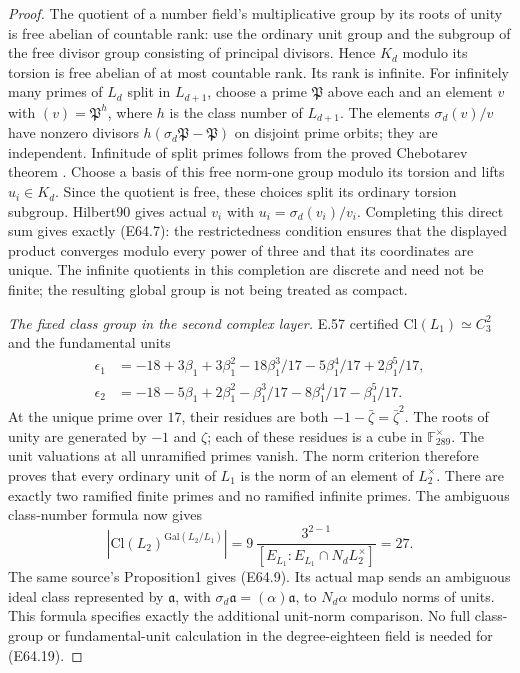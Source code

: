 \begin{proof}
The quotient of a number field's multiplicative group by its roots
of unity is free abelian of countable rank: use the ordinary unit
group and the subgroup of the free divisor group consisting of
principal divisors. Hence $K_d$ modulo its torsion is free abelian
of at most countable rank. Its rank is infinite.
For infinitely many primes of $L_d$ split in $L_{d+1}$, choose a
prime $\mathfrak P$ above each and an element $v$ with
$(v)=\mathfrak P^h$, where $h$ is the class number of $L_{d+1}$.
The elements $\sigma_d(v)/v$ have nonzero divisors
$h(\sigma_d\mathfrak P-\mathfrak P)$ on disjoint prime orbits;
they are independent. Infinitude of split primes follows from
the proved Chebotarev theorem
\cite[VIII, Theorem7.4]{E_MilneCFT}.
Choose a basis of this free norm-one group modulo its torsion
and lifts $u_i\in K_d$. Since the quotient is free, these choices
split its ordinary torsion subgroup. Hilbert90 gives actual
$v_i$ with $u_i=\sigma_d(v_i)/v_i$.
Completing this direct sum gives exactly (E64.7):
the restrictedness condition ensures that the displayed product
converges modulo every power of three and that its coordinates
are unique. The infinite quotients in this completion are
discrete and need not be finite; the resulting global group
is not being treated as compact.

\emph{The fixed class group in the second complex layer.}
E.57 certified
$\mathrm {Cl}(L_1)\simeq C_3^2$ and the fundamental units
\[
 \begin{split}
 \epsilon_1&=-18+3\beta_1+3\beta_1^2
       -18\beta_1^3/17-5\beta_1^4/17+2\beta_1^5/17,\\
 \epsilon_2&=-18-5\beta_1+2\beta_1^2
       -\beta_1^3/17-8\beta_1^4/17-\beta_1^5/17 .
 \end{split}
 \tag{E64.18}
\]
At the unique prime over $17$, their residues are both
$-1-\bar\zeta=\bar\zeta^2$.
The roots of unity are generated by $-1$ and $\zeta$; each
of these residues is a cube in $\mathbb F_{289}^\times$.
The unit valuations at all unramified primes vanish.
The norm criterion therefore proves that every ordinary unit of
$L_1$ is the norm of an element of $L_2^\times$.
There are exactly two ramified finite primes and no ramified
infinite primes. The ambiguous class-number formula
\cite[Theorem1, formula(1)]{E_LemmermeyerAmbiguous} now gives
\[
 |\mathrm {Cl}(L_2)^{\mathrm {Gal}(L_2/L_1)}|
     =9\,\frac{3^{2-1}}{[E_{L_1}:E_{L_1}\cap N_dL_2^\times]}
     =27 .
 \tag{E64.19}
\]
The same source's Proposition1 gives (E64.9).
Its actual map sends an ambiguous ideal class represented by
$\mathfrak a$, with $\sigma_d\mathfrak a=(\alpha)\mathfrak a$,
to $N_d\alpha$ modulo norms of units. This formula specifies
exactly the additional unit-norm comparison.
No full class-group or fundamental-unit calculation in the
degree-eighteen field is needed for (E64.19).


\end{proof}
